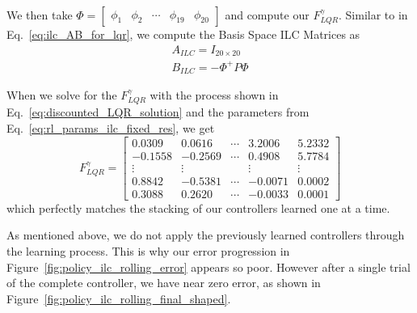 We then take $\Phi = \begin{bmatrix}\phi_1 & \phi_2 & \cdots & \phi_{19} & \phi_{20}\end{bmatrix}$ and compute our $F_{LQR}^\gamma$. Similar to in Eq.~\ref{eq:ilc_AB_for_lqr}, we compute the Basis Space ILC Matrices as
\begin{equation}
    \begin{split}
        A_{ILC} = I_{20 \times 20} \\
        B_{ILC} = -\Phi^+ P \Phi
    \end{split}
\end{equation}

When we solve for the $F_{LQR}^\gamma$ with the process shown in Eq.~\ref{eq:discounted_LQR_solution} and the parameters from Eq.~\ref{eq:rl_params_ilc_fixed_res}, we get
\begin{equation}
    F_{LQR}^\gamma
    = 
    \begin{bmatrix}
        0.0309  &  0.0616 & \cdots & 3.2006  &  5.2332 \\
        -0.1558 &  -0.2569 & \cdots & 0.4908  &  5.7784 \\
        \vdots & \vdots & & \vdots & \vdots \\
        0.8842 &  -0.5381& \cdots & -0.0071  &  0.0002 \\
        0.3088&    0.2620& \cdots & -0.0033  &  0.0001 
    \end{bmatrix}
\end{equation}
which perfectly matches the stacking of our controllers learned one at a time.


As mentioned above, we do not apply the previously learned controllers through the learning process. This is why our error progression in Figure~\ref{fig:policy_ilc_rolling_error} appears so poor. However after a single trial of the complete controller, we have near zero error, as shown in Figure~\ref{fig:policy_ilc_rolling_final_shaped}. 

